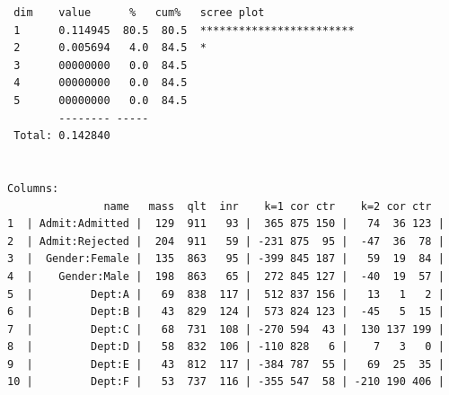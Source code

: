 \documentclass[10pt]{report}\usepackage[]{graphicx}\usepackage[]{color}
\makeatletter
\newenvironment{kframe}{%
 \def\at@end@of@kframe{}%
 \ifinner\ifhmode%
  \def\at@end@of@kframe{\end{minipage}}%
  \begin{minipage}{\columnwidth}%
 \fi\fi%
 \def\FrameCommand##1{\hskip\@totalleftmargin \hskip-\fboxsep
 \colorbox{shadecolor}{##1}\hskip-\fboxsep
     \hskip-\linewidth \hskip-\@totalleftmargin \hskip\columnwidth}%
 \MakeFramed {\advance\hsize-\width
   \@totalleftmargin\z@ \linewidth\hsize
   \@setminipage}}%
 {\par\unskip\endMakeFramed%
 \at@end@of@kframe}
\newenvironment{knitrout}{}{} %
\renewenvironment{knitrout}{\small\renewcommand{\baselinestretch}{.85}}{} %
\makeatother
\begin{document}
\begin{Exercises}
\begin{enumerate*}
\begin{ans}
\begin{knitrout}
\begin{kframe}
\begin{verbatim}
 dim    value      %   cum%   scree plot               
 1      0.114945  80.5  80.5  ************************ 
 2      0.005694   4.0  84.5  *                        
 3      00000000   0.0  84.5                           
 4      00000000   0.0  84.5                           
 5      00000000   0.0  84.5                           
        -------- -----                                 
 Total: 0.142840                                       


Columns:
               name   mass  qlt  inr    k=1 cor ctr    k=2 cor ctr  
1  | Admit:Admitted |  129  911   93 |  365 875 150 |   74  36 123 |
2  | Admit:Rejected |  204  911   59 | -231 875  95 |  -47  36  78 |
3  |  Gender:Female |  135  863   95 | -399 845 187 |   59  19  84 |
4  |    Gender:Male |  198  863   65 |  272 845 127 |  -40  19  57 |
5  |         Dept:A |   69  838  117 |  512 837 156 |   13   1   2 |
6  |         Dept:B |   43  829  124 |  573 824 123 |  -45   5  15 |
7  |         Dept:C |   68  731  108 | -270 594  43 |  130 137 199 |
8  |         Dept:D |   58  832  106 | -110 828   6 |    7   3   0 |
9  |         Dept:E |   43  812  117 | -384 787  55 |   69  25  35 |
10 |         Dept:F |   53  737  116 | -355 547  58 | -210 190 406 |
\end{verbatim}
\end{kframe}
\end{knitrout}

    \end{ans}
    

\end{enumerate*}
\end{Exercises}
\end{document}
